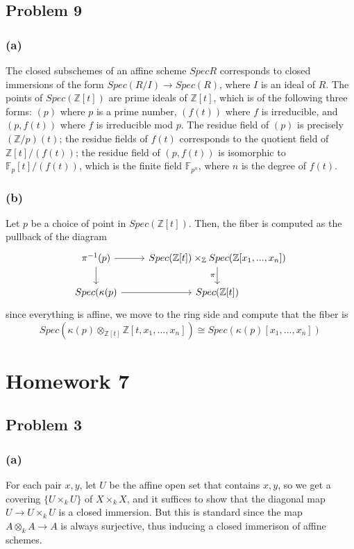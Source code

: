 \documentclass{article}
\theoremstyle{definition}
\theoremstyle{definition}
\theoremstyle{definition}
\theoremstyle{definition}
\theoremstyle{definition}
\theoremstyle{definition}
\theoremstyle{definition}
\begin{document}
\subsection*{Problem 9}

\subsubsection*{(a)}
The closed subschemes of an affine scheme $Spec R$ corresponds to closed immersions of the form $Spec(R/I)\to Spec(R)$, where $I$ is an ideal of $R$. The points of $Spec(\mathbb{Z}[t])$ are prime ideals of $\mathbb{Z}[t]$, which is of the following three forms: $(p)$ where $p$ is a prime number, $(f(t))$ where $f$ is irreducible, and $(p,f(t))$ where $f$ is irreducible mod $p$. The residue field of $(p)$ is precisely $(\mathbb{Z}/p)(t)$; the residue fields of $f(t)$ corresponds to the quotient field of $\mathbb{Z}[t]/(f(t))$; the residue field of $(p,f(t))$ is isomorphic to $\mathbb{F}_p[t]/(f(t))$, which is the finite field $\mathbb{F}_{p^n}$, where $n$ is the degree of $f(t)$.
\subsubsection*{(b)}
Let $p$ be a choice of point in $Spec(\mathbb{Z}[t])$. Then, the fiber is computed as the pullback of the diagram
\[\begin{tikzcd}
	{\pi^{-1}(p)} & {Spec(\mathbb{Z}[t])\times_{\mathbb{Z}}Spec(\mathbb{Z}[x_1,...,x_n])} \\
	{Spec(\kappa(p)} & {Spec(\mathbb{Z}[t])}
	\arrow[from=1-1, to=1-2]
	\arrow[from=1-1, to=2-1]
	\arrow["\pi"', from=1-2, to=2-2]
	\arrow[from=2-1, to=2-2]
\end{tikzcd}\]
since everything is affine, we move to the ring side and compute that the fiber is 
\[Spec(\kappa(p)\otimes_{\mathbb{Z}[t]}\mathbb{Z}[t,x_1,...,x_n])\cong Spec(\kappa(p)[x_1,...,x_n])\]

\section*{Homework 7}

\subsection*{Problem 3}
\subsubsection*{(a)}
For each pair $x,y$, let $U$ be the affine open set that contains $x,y$, so we get a covering $\{U\times_k U\}$ of $X\times_k X$, and it suffices to show that the diagonal map $U\to U\times_k U$ is a closed immersion. But this is standard since the map $A\otimes_k A\to A $ is always surjective, thus inducing a closed immerison of affine schemes. 
\end{document}
